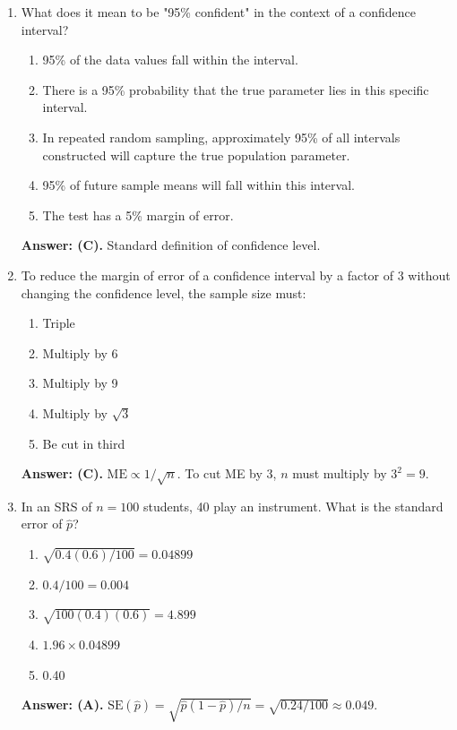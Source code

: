 \begin{enumerate}[leftmargin=1.5em]
  \item What does it mean to be "95\% confident" in the context of a confidence interval?
  \begin{enumerate}[label=(\Alph*)]
    \item 95\% of the data values fall within the interval.
    \item There is a 95\% probability that the true parameter lies in this specific interval.
    \item In repeated random sampling, approximately 95\% of all intervals constructed will capture the true population parameter.
    \item 95\% of future sample means will fall within this interval.
    \item The test has a 5\% margin of error.
  \end{enumerate}
  \textbf{Answer: (C).} Standard definition of confidence level.

  \item To reduce the margin of error of a confidence interval by a factor of 3 without changing the confidence level, the sample size must:
  \begin{enumerate}[label=(\Alph*)]
    \item Triple \item Multiply by 6 \item Multiply by 9 \item Multiply by $\sqrt{3}$ \item Be cut in third
  \end{enumerate}
  \textbf{Answer: (C).} $\text{ME} \propto 1/\sqrt{n}$. To cut ME by 3, $n$ must multiply by $3^2 = 9$.

  \item In an SRS of $n = 100$ students, 40 play an instrument. What is the standard error of $\hat{p}$?
  \begin{enumerate}[label=(\Alph*)]
    \item $\sqrt{0.4(0.6)/100} = 0.04899$ \item $0.4 / 100 = 0.004$ \item $\sqrt{100(0.4)(0.6)} = 4.899$ \item $1.96 \times 0.04899$ \item 0.40
  \end{enumerate}
  \textbf{Answer: (A).} $\text{SE}(\hat{p}) = \sqrt{\hat{p}(1-\hat{p})/n} = \sqrt{0.24/100} \approx 0.049$.


\end{enumerate}
